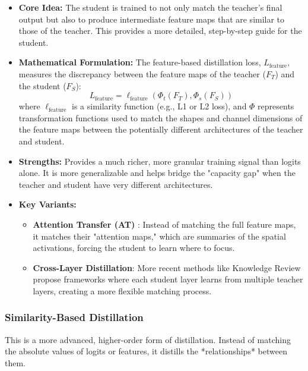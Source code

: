 \begin{itemize}
    \item \textbf{Core Idea:} The student is trained to not only match the teacher's final output but also to produce intermediate feature maps that are similar to those of the teacher. This provides a more detailed, step-by-step guide for the student.
    \item \textbf{Mathematical Formulation:} The feature-based distillation loss, \(L_{\text{feature}}\), measures the discrepancy between the feature maps of the teacher (\(F_T\)) and the student (\(F_S\)):
    \[
        L_{\text{feature}} = \ell_{\text{feature}}(\Phi_t(F_T), \Phi_s(F_S))
    \]
    where \(\ell_{\text{feature}}\) is a similarity function (e.g., L1 or L2 loss), and \(\Phi\) represents transformation functions used to match the shapes and channel dimensions of the feature maps between the potentially different architectures of the teacher and student.
    \item \textbf{Strengths:} Provides a much richer, more granular training signal than logits alone. It is more generalizable and helps bridge the "capacity gap" when the teacher and student have very different architectures.
    \item \textbf{Key Variants:}
        \begin{itemize}
            \item \textbf{Attention Transfer (AT)} \cite{Zagoruyko2016}: Instead of matching the full feature maps, it matches their "attention maps," which are summaries of the spatial activations, forcing the student to learn where to focus.
            \item \textbf{Cross-Layer Distillation}: More recent methods like Knowledge Review \cite{Chen2021d} propose frameworks where each student layer learns from multiple teacher layers, creating a more flexible matching process.
        \end{itemize}
\end{itemize}

\subsubsection{Similarity-Based Distillation}
\label{ssec:similarity_based}

This is a more advanced, higher-order form of distillation. Instead of matching the absolute values of logits or features, it distills the *relationships* between them.

